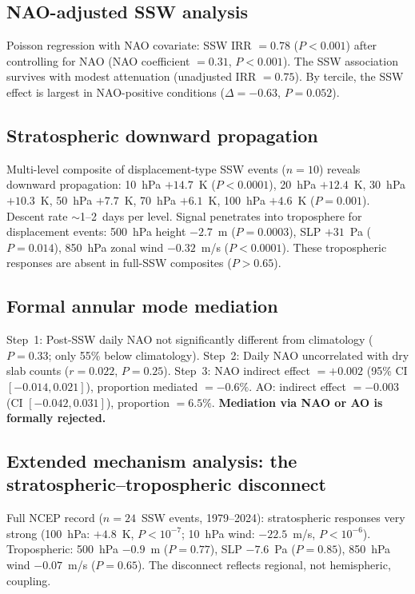 \documentclass[11pt,letterpaper]{article}
\begin{document}
\subsection{NAO-adjusted SSW analysis}

Poisson regression with NAO covariate: SSW IRR $= 0.78$ ($P < 0.001$) after controlling for NAO (NAO coefficient $= 0.31$, $P < 0.001$). The SSW association survives with modest attenuation (unadjusted IRR $= 0.75$). By tercile, the SSW effect is largest in NAO-positive conditions ($\Delta = -0.63$, $P = 0.052$).

\subsection{Stratospheric downward propagation}

Multi-level composite of displacement-type SSW events ($n = 10$) reveals downward propagation: 10~hPa $+14.7$~K ($P < 0.0001$), 20~hPa $+12.4$~K, 30~hPa $+10.3$~K, 50~hPa $+7.7$~K, 70~hPa $+6.1$~K, 100~hPa $+4.6$~K ($P = 0.001$). Descent rate $\sim$1--2~days per level. Signal penetrates into troposphere for displacement events: 500~hPa height $-2.7$~m ($P = 0.0003$), SLP $+31$~Pa ($P = 0.014$), 850~hPa zonal wind $-0.32$~m/s ($P < 0.0001$). These tropospheric responses are absent in full-SSW composites ($P > 0.65$).

\subsection{Formal annular mode mediation}

Step~1: Post-SSW daily NAO not significantly different from climatology ($P = 0.33$; only 55\% below climatology). Step~2: Daily NAO uncorrelated with dry slab counts ($r = 0.022$, $P = 0.25$). Step~3: NAO indirect effect $= +0.002$ (95\% CI $[-0.014, 0.021]$), proportion mediated $= -0.6\%$. AO: indirect effect $= -0.003$ (CI $[-0.042, 0.031]$), proportion $= 6.5\%$. \textbf{Mediation via NAO or AO is formally rejected.}

\subsection{Extended mechanism analysis: the stratospheric--tropospheric disconnect}

Full NCEP record ($n = 24$~SSW events, 1979--2024): stratospheric responses very strong (100~hPa: $+4.8$~K, $P < 10^{-7}$; 10~hPa wind: $-22.5$~m/s, $P < 10^{-6}$). Tropospheric: 500~hPa $-0.9$~m ($P = 0.77$), SLP $-7.6$~Pa ($P = 0.85$), 850~hPa wind $-0.07$~m/s ($P = 0.65$). The disconnect reflects regional, not hemispheric, coupling.
\end{document}
